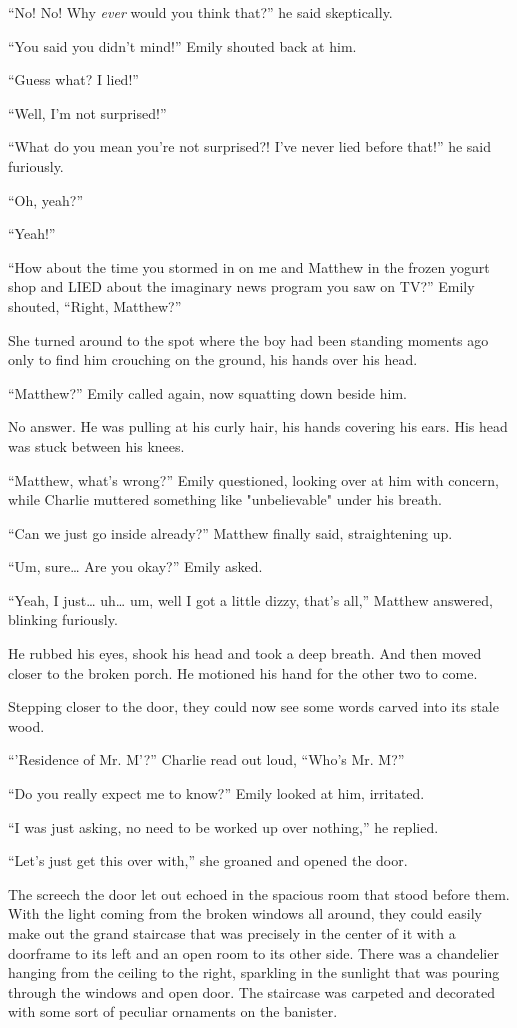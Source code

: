 “No! No! Why \textit{ever} would you think that?” he said skeptically.

“You said you didn't mind!” Emily shouted back at him.

“Guess what? I lied!”

“Well, I'm not surprised!”

“What do you mean you're not surprised?! I've never lied before that!” he said furiously.

“Oh, yeah?”

“Yeah!”

“How about the time you stormed in on me and Matthew in the frozen yogurt shop and LIED about the imaginary news program you saw on TV?” Emily shouted, “Right, Matthew?”

She turned around to the spot where the boy had been standing moments ago only to find him crouching on the ground, his hands over his head.

“Matthew?” Emily called again, now squatting down beside him.

No answer. He was pulling at his curly hair, his hands covering his ears. His head was stuck between his knees.

“Matthew, what's wrong?” Emily questioned, looking over at him with concern, while Charlie muttered something like "unbelievable" under his breath.

“Can we just go inside already?” Matthew finally said, straightening up.

“Um, sure… Are you okay?” Emily asked.

“Yeah, I just… uh… um, well I got a little dizzy, that's all,” Matthew answered, blinking furiously.

He rubbed his eyes, shook his head and took a deep breath. And then moved closer to the broken porch. He motioned his hand for the other two to come.

Stepping closer to the door, they could now see some words carved into its stale wood.

“'Residence of Mr. M'?” Charlie read out loud, “Who's Mr. M?”

“Do you really expect me to know?” Emily looked at him, irritated.

“I was just asking, no need to be worked up over nothing,” he replied.

“Let's just get this over with,” she groaned and opened the door.

The screech the door let out echoed in the spacious room that stood before them. With the light coming from the broken windows all around, they could easily make out the grand staircase that was precisely in the center of it with a doorframe to its left and an open room to its other side. There was a chandelier hanging from the ceiling to the right, sparkling in the sunlight that was pouring through the windows and open door. The staircase was carpeted and decorated with some sort of peculiar ornaments on the banister.

